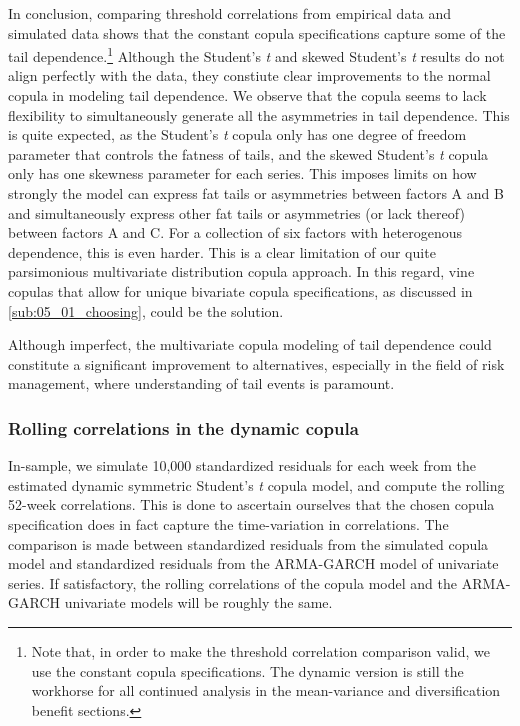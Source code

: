 In conclusion, comparing threshold correlations from empirical data and simulated data shows that the constant copula specifications capture some of the tail dependence.\footnote{Note that, in order to make the threshold correlation comparison valid, we use the constant copula specifications. The dynamic version is still the workhorse for all continued analysis in the mean-variance and diversification benefit sections.} Although the Student's \textit{t} and skewed Student's \textit{t} results do not align perfectly with the data, they constiute clear improvements to the normal copula in modeling tail dependence. We observe that the copula seems to lack flexibility to simultaneously generate all the asymmetries in tail dependence. This is quite expected, as the Student's \textit{t} copula only has one degree of freedom parameter that controls the fatness of tails, and the skewed Student's \textit{t} copula only has one skewness parameter for each series. This imposes limits on how strongly the model can express fat tails or asymmetries between factors A and B and simultaneously express other fat tails or asymmetries (or lack thereof) between factors A and C. For a collection of six factors with heterogenous dependence, this is even harder. This is a clear limitation of our quite parsimonious multivariate distribution copula approach. In this regard, vine copulas that allow for unique bivariate copula specifications, as discussed in \autoref{sub:05_01_choosing}, could be the solution.

Although imperfect, the multivariate copula modeling of tail dependence could constitute a significant improvement to alternatives, especially in the field of risk management, where understanding of tail events is paramount.

\subsubsection{Rolling correlations in the dynamic copula}

In-sample, we simulate 10,000 standardized residuals for each week from the estimated dynamic symmetric Student's \textit{t} copula model, and compute the rolling 52-week correlations. This is done to ascertain ourselves that the chosen copula specification does in fact capture the time-variation in correlations. The comparison is made between standardized residuals from the simulated copula model and standardized residuals from the ARMA-GARCH model of univariate series. If satisfactory, the rolling correlations of the copula model and the ARMA-GARCH univariate models will be roughly the same.


